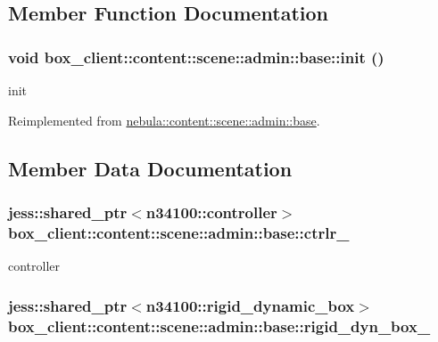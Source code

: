 \subsection{Member Function Documentation}
\hypertarget{classbox__client_1_1content_1_1scene_1_1admin_1_1base_a9d0a4b10966e7b1be63a3fa83ef6bfec}{
\subsubsection[{init}]{\setlength{\rightskip}{0pt plus 5cm}void box\_\-client::content::scene::admin::base::init ()}}
\label{classbox__client_1_1content_1_1scene_1_1admin_1_1base_a9d0a4b10966e7b1be63a3fa83ef6bfec}


init 

Reimplemented from \hyperlink{classnebula_1_1content_1_1scene_1_1admin_1_1base_a7d0a6e0325998166d84d4118634cd15d}{nebula::content::scene::admin::base}.

\subsection{Member Data Documentation}
\hypertarget{classbox__client_1_1content_1_1scene_1_1admin_1_1base_a5f50336d66a915f60f7da37d558ff9fb}{
\subsubsection[{ctrlr\_\-}]{\setlength{\rightskip}{0pt plus 5cm}jess::shared\_\-ptr$<${\bf n34100::controller}$>$ {\bf box\_\-client::content::scene::admin::base::ctrlr\_\-}}}
\label{classbox__client_1_1content_1_1scene_1_1admin_1_1base_a5f50336d66a915f60f7da37d558ff9fb}


controller \hypertarget{classbox__client_1_1content_1_1scene_1_1admin_1_1base_a69268221fb3d31b951f15d3813365764}{
\subsubsection[{rigid\_\-dyn\_\-box\_\-}]{\setlength{\rightskip}{0pt plus 5cm}jess::shared\_\-ptr$<${\bf n34100::rigid\_\-dynamic\_\-box}$>$ {\bf box\_\-client::content::scene::admin::base::rigid\_\-dyn\_\-box\_\-}}}
\label{classbox__client_1_1content_1_1scene_1_1admin_1_1base_a69268221fb3d31b951f15d3813365764}


